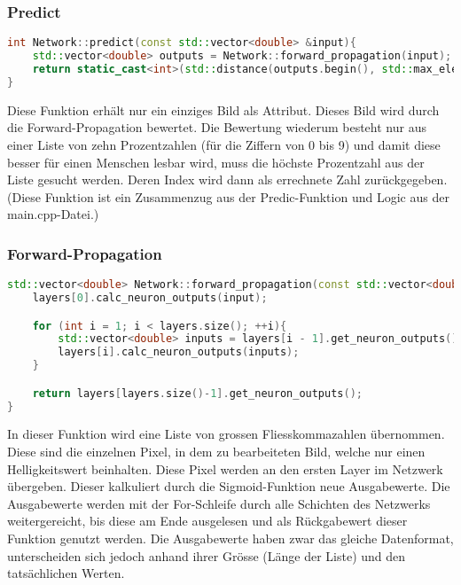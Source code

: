 \subsubsection{Predict}
\label{sec:RealPredictCode}
\begin{lstlisting}[language=C++]
int Network::predict(const std::vector<double> &input){
    std::vector<double> outputs = Network::forward_propagation(input);
    return static_cast<int>(std::distance(outputs.begin(), std::max_element(outputs.begin(), outputs.end())));
}
\end{lstlisting}
Diese Funktion erhält nur ein einziges Bild als Attribut. Dieses Bild wird durch die Forward-Propagation bewertet. Die Bewertung wiederum besteht nur aus einer Liste von zehn Prozentzahlen (für die Ziffern von 0 bis 9) und damit diese besser für einen Menschen lesbar wird, muss die höchste Prozentzahl aus der Liste gesucht werden. Deren Index wird dann als errechnete Zahl zurückgegeben.
\\
(Diese Funktion ist ein Zusammenzug aus der Predic-Funktion und Logic aus der main.cpp-Datei.)

\subsubsection{Forward-Propagation}
\label{sec:RealForwardPropagationCode}
\begin{lstlisting}[language=C++]
std::vector<double> Network::forward_propagation(const std::vector<double>& input){
    layers[0].calc_neuron_outputs(input);

    for (int i = 1; i < layers.size(); ++i){
        std::vector<double> inputs = layers[i - 1].get_neuron_outputs();
        layers[i].calc_neuron_outputs(inputs);
    }

    return layers[layers.size()-1].get_neuron_outputs();
}
\end{lstlisting}
In dieser Funktion wird eine Liste von grossen Fliesskommazahlen übernommen. Diese sind die einzelnen Pixel, in dem zu bearbeiteten Bild, welche nur einen Helligkeitswert beinhalten. Diese Pixel werden an den ersten Layer im Netzwerk übergeben. Dieser kalkuliert durch die Sigmoid-Funktion neue Ausgabewerte. Die Ausgabewerte werden mit der For-Schleife durch alle Schichten des Netzwerks weitergereicht, bis diese am Ende ausgelesen und als Rückgabewert dieser Funktion genutzt werden. Die Ausgabewerte haben zwar das gleiche Datenformat, unterscheiden sich jedoch anhand ihrer Grösse (Länge der Liste) und den tatsächlichen Werten.

